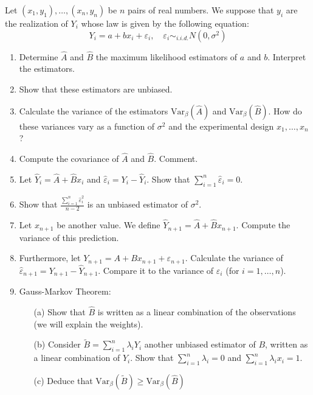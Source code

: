 \begin{exercise}
Let \((x_1, y_1), \ldots, (x_n, y_n)\) be \(n\) pairs of real numbers. We suppose that \(y_i\) are the realization of \(Y_i\) whose law is given by the following equation:
\[Y_i = a + bx_i + \varepsilon_i, \quad \varepsilon_i \sim_{i.i.d.} N(0, \sigma^2)\]

\begin{enumerate}
    \item Determine \(\hat{A}\) and \(\hat{B}\) the maximum likelihood estimators of \(a\) and \(b\). Interpret the estimators.

    \item Show that these estimators are unbiased.

    \item Calculate the variance of the estimators \(\text{Var}_{\beta}(\hat{A})\) and \(\text{Var}_{\beta}(\hat{B})\). How do these variances vary as a function of \(\sigma^2\) and the experimental design \(x_1, \ldots, x_n\)?

    \item Compute the covariance of \(\hat{A}\) and \(\hat{B}\). Comment.

    \item Let \(\hat{Y}_i = \hat{A} + \hat{B}x_i\) and \(\hat{\varepsilon}_i = Y_i - \hat{Y}_i\). Show that \(\sum_{i=1}^n \hat{\varepsilon}_i = 0\).

    \item Show that \(\frac{\sum_{i=1}^n \hat{\varepsilon}_i^2}{n-2}\) is an unbiased estimator of \(\sigma^2\).

    \item Let \(x_{n+1}\) be another value. We define \(\hat{Y}_{n+1} = \hat{A} + \hat{B}x_{n+1}\). Compute the variance of this prediction.

    \item Furthermore, let \(Y_{n+1} = A + Bx_{n+1} + \varepsilon_{n+1}\). Calculate the variance of \(\hat{\varepsilon}_{n+1} = Y_{n+1} - \hat{Y}_{n+1}\). Compare it to the variance of \(\varepsilon_i\) (for \(i = 1, \ldots, n\)).

    \item Gauss-Markov Theorem:
    \begin{enumerate}
        \item[(a)] Show that \(\hat{B}\) is written as a linear combination of the observations (we will explain the weights).

        \item[(b)] Consider \(\tilde{B} = \sum_{i=1}^n \lambda_i Y_i\) another unbiased estimator of \(B\), written as a linear combination of \(Y_i\). Show that \(\sum_{i=1}^n \lambda_i = 0\) and \(\sum_{i=1}^n \lambda_i x_i = 1\).

        \item[(c)] Deduce that \(\text{Var}_{\beta}(\tilde{B}) \geq \text{Var}_{\beta}(\hat{B})\)
    \end{enumerate}
\end{enumerate}
\end{exercise}